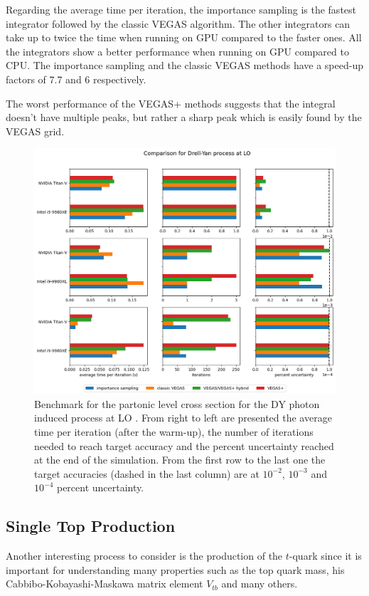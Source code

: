 \documentclass[../main/main.tex]{subfiles}
\begin{document}
Regarding the average time per iteration, the importance sampling is the fastest integrator followed by the classic VEGAS algorithm. The other integrators can take up to twice the time when running on GPU compared to the faster ones. All the integrators show a better performance when running on GPU compared to CPU. The importance sampling and the classic VEGAS methods have a speed-up factors of 7.7 and 6 respectively.

The worst performance of the VEGAS+ methods suggests that the integral doesn't have multiple peaks, but rather a sharp peak which is easily found by the VEGAS grid. 


\begin{figure}[]
	\centering
	\includegraphics[width=\textwidth]{../images/pineappl_final.png}
	\caption{Benchmark  for the partonic level cross section for the DY photon induced process  at LO \cite{Carrazza_2020}. From right to left are presented the average time per iteration (after the warm-up), the number of iterations needed to reach target accuracy and the percent uncertainty reached at the end of the simulation. From the first row to the last one the target accuracies (dashed in the last column) are at $10^{-2}$, $10^{-3}$ and $10^{-4}$ percent uncertainty.}
	\label{pineappl_plot}
\end{figure}





\subsection{Single Top Production}
\label{singletop_sect}
Another interesting process to consider is the production of the $t$-quark since it is important for understanding many properties such as the top quark mass, his  Cabbibo-Kobayashi-Maskawa matrix element $V_{tb}$ and many others.
\end{document}
